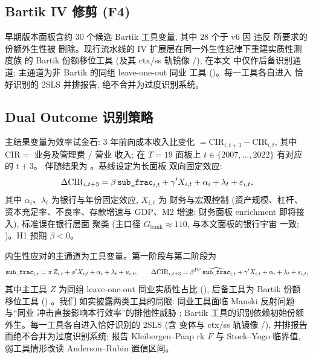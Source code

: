 \subsection{Bartik IV 修剪 (F4)}
早期版本面板含约 30 个候选 Bartik 工具变量, 其中 28 个于 v6 因
违反 \textcite{goldsmithpinkham2020bartik} 所要求的份额外生性被
删除。现行流水线的 IV 扩展层在同一外生性纪律下重建实质性测度族
的 Bartik 份额移位工具  (及其
ctx/ss 轨镜像 /), 在本文
中仅作后备识别通道; 主通道为非 Bartik 的同组 leave-one-out 同业
工具 ()。每一工具各自进入
恰好识别的 2SLS 并排报告, 绝不合并为过度识别系统。

\subsection{Dual Outcome 识别策略}
主结果变量为效率试金石: 3 年前向成本收入比变化
 $= \mathrm{CIR}_{i,t+3} -
\mathrm{CIR}_{i,t}$, 其中 $\mathrm{CIR} = $ 业务及管理费 $/$ 营业
收入; 在 $T=19$ 面板上 $t\in\{2007,\dots,2022\}$ 有对应的 $t+3$。
伴随结果为 。基线设定为长面板
双向固定效应:
\begin{equation}
\Delta \mathrm{CIR}_{i,t+3}
 = \beta\,\texttt{sub\_frac}_{i,t}
 + \gamma' X_{i,t} + \alpha_i + \lambda_t + \varepsilon_{i,t},
\label{eq:baseline}
\end{equation}
其中 $\alpha_i$、$\lambda_t$ 为银行与年份固定效应, $X_{i,t}$ 为
财务与宏观控制 (资产规模、杠杆、资本充足率、不良率、存款增速与
GDP、M2 增速; 财务面板 enrichment 即将接入), 标准误在银行层面
聚类 (主口径 $G_{\text{bank}}\approx 110$, 与本文面板的银行宇宙
一致; )。H1 预期
$\beta<0$。

内生性应对的主通道为工具变量。第一阶段与第二阶段为
\begin{equation}
\texttt{sub\_frac}_{i,t} = \pi\, Z_{i,t} + \phi' X_{i,t}
 + \alpha_i + \lambda_t + u_{i,t}, \qquad
\Delta \mathrm{CIR}_{i,t+3} = \beta^{IV}\,
 \widehat{\texttt{sub\_frac}}_{i,t} + \gamma' X_{i,t}
 + \alpha_i + \lambda_t + \varepsilon_{i,t},
\label{eq:iv}
\end{equation}
其中主工具 $Z$ 为同组 leave-one-out 同业实质性占比
(), 后备工具为 Bartik 份额
移位工具 ()
\parencite{learyroberts2014peer,goldsmithpinkham2020bartik}。我们
如实披露两类工具的局限: 同业工具面临 Manski 反射问题与``同业
冲击直接影响本行效率''的排他性威胁
\parencite{manski1993reflection}; Bartik 工具的识别依赖初始份额
外生。每一工具各自进入恰好识别的 2SLS (含  变体与
ctx/ss 轨镜像 /), 并排报告
而绝不合并为过度识别系统; 报告 Kleibergen--Paap rk $F$ 与
Stock--Yogo 临界值, 弱工具情形改读 Anderson--Rubin 置信区间。

